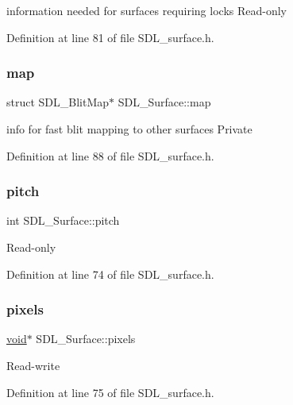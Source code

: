 information needed for surfaces requiring locks Read-\/only 

Definition at line 81 of file S\+D\+L\+\_\+surface.\+h.

\mbox{\label{struct_s_d_l___surface_a8c1ecad399b0d4f525b1a53b6ee9393f}} 
\subsubsection{\texorpdfstring{map}{map}}
{\footnotesize\ttfamily struct S\+D\+L\+\_\+\+Blit\+Map$\ast$ S\+D\+L\+\_\+\+Surface\+::map}

info for fast blit mapping to other surfaces Private 

Definition at line 88 of file S\+D\+L\+\_\+surface.\+h.

\mbox{\label{struct_s_d_l___surface_a5fa37325d77d65b2ed64ffc7cd01bb6c}} 
\subsubsection{\texorpdfstring{pitch}{pitch}}
{\footnotesize\ttfamily int S\+D\+L\+\_\+\+Surface\+::pitch}

Read-\/only 

Definition at line 74 of file S\+D\+L\+\_\+surface.\+h.

\mbox{\label{struct_s_d_l___surface_abd9597e0e084b8ef33fe0397bc26d911}} 
\subsubsection{\texorpdfstring{pixels}{pixels}}
{\footnotesize\ttfamily \mbox{\hyperlink{_s_d_l__opengles2__gl2ext_8h_ae5d8fa23ad07c48bb609509eae494c95}{void}}$\ast$ S\+D\+L\+\_\+\+Surface\+::pixels}

Read-\/write 

Definition at line 75 of file S\+D\+L\+\_\+surface.\+h.

\mbox{\label{struct_s_d_l___surface_a03d10628a359c0674f5ceffd574f1641}} 

